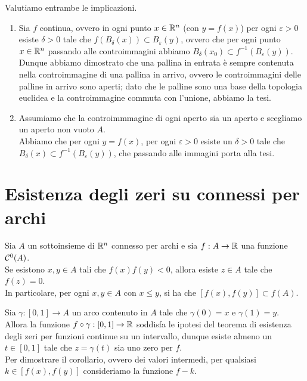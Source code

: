 \documentclass[openany]{book}
\begin{document}
    Valutiamo entrambe le implicazioni.\begin{enumerate}
        \item Sia $f$ continua, ovvero in ogni punto $x\in\mathbb{R}^n$ (con $y=f(x)$) per ogni $\varepsilon>0$ esiste $\delta>0$ tale che $f(B_\delta(x)) \subset B_\varepsilon (y)$, ovvero che per ogni punto $x\in\mathbb{R}^n$ passando alle controimmagini abbiamo $B_\delta(x_0) \subset f^{-1}(B_\varepsilon(y))$.\\ Dunque abbiamo dimostrato che una pallina in entrata è sempre contenuta nella controimmagine di una pallina in arrivo, ovvero le controimmagini delle palline in arrivo sono aperti; dato che le palline sono una base della topologia euclidea e la controimmagine commuta con l'unione, abbiamo la tesi.
        \item Assumiamo che la controimmmagine di ogni aperto sia un aperto e scegliamo un aperto non vuoto $A$.\\
        Abbiamo che per ogni $y = f(x)$, per ogni $\varepsilon>0$ esiste un $\delta>0$ tale che $B_\delta(x) \subset f^{-1}(B_\varepsilon(y))$, che passando alle immagini porta alla tesi.
    \end{enumerate}


\section{Esistenza degli zeri su connessi per archi}

\begin{theorem}{}{}
    Sia $A$ un sottoinsieme di $\mathbb{R}^n$ connesso per archi e sia $f: A\to\mathbb{R}$ una funzione $\mathcal{C}^0(A)$.\\
    Se esistono $x,y \in A$ tali che $f(x)f(y)<0$, allora esiste $z \in A$ tale che $f(z)=0$.\\
    In particolare, per ogni $x,y \in A$ con $x\le y$, si ha che $[f(x), f(y)] \subset f(A)$.
\end{theorem}

    Sia $\gamma : [0,1] \to A$ un arco contenuto in $A$ tale che $\gamma(0) = x$ e $\gamma(1)=y$.\\
    Allora la funzione $f\circ \gamma : [0,1] \to \mathbb{R}$ soddisfa le ipotesi del teorema di esistenza degli zeri per funzioni continue su un intervallo, dunque esiste almeno un $t \in [0,1]$ tale che $z = \gamma(t)$ sia uno zero per $f$. \\
    Per dimostrare il corollario, ovvero dei valori intermedi, per qualsiasi $k \in [f(x),f(y)]$ consideriamo la funzione $f-k$.
\end{document}
